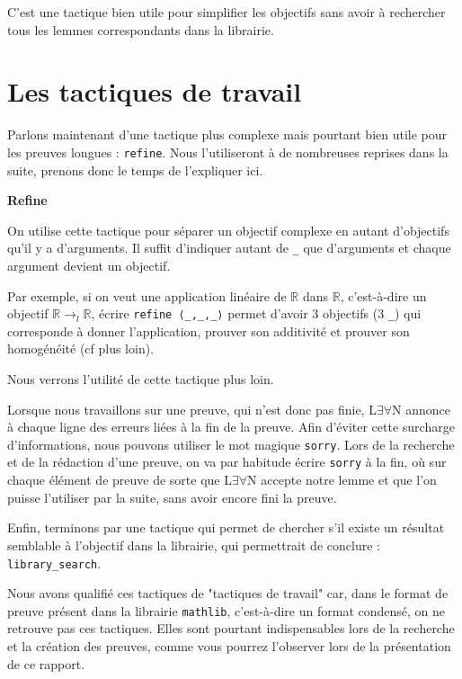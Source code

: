 \documentclass[a4paper, 11pt, twoside]{report}
\newcommand\R{\mathbb{R}}
\newcommand{\LEAN}{L$\exists\forall$N }
\begin{document}
C'est une tactique bien utile pour simplifier les objectifs sans avoir à rechercher tous les lemmes correspondants dans la librairie.

\section{Les tactiques de travail}

Parlons maintenant d'une tactique plus complexe mais pourtant bien utile pour les preuves longues : \verb|refine|. Nous l'utiliseront à de nombreuses reprises dans la suite, prenons donc le temps de l'expliquer ici.

\begin{tactic}
	\centerline{\bfseries Refine}
	
	On utilise cette tactique pour séparer un objectif complexe en autant d'objectifs qu'il y a d'arguments. Il suffit d'indiquer autant de \verb|_| que d'arguments et chaque argument devient un objectif.
	
	\tcblower
	
	Par exemple, si on veut une application linéaire de $\R$ dans $\R$, c'est-à-dire un objectif $\R \to_l \R$, écrire \verb|refine ⟨_,_,_⟩| permet d'avoir 3 objectifs (3 \verb|_|) qui corresponde à donner l'application, prouver son additivité et prouver son homogénéité (cf plus loin).
\end{tactic}

Nous verrons l'utilité de cette tactique plus loin.

\medskip

Lorsque nous travaillons sur une preuve, qui n'est donc pas finie, \LEAN annonce à chaque ligne des erreurs liées à la fin de la preuve. Afin d'éviter cette surcharge d'informations, nous pouvons utiliser le mot magique \verb|sorry|. Lors de la recherche et de la rédaction d'une preuve, on va par habitude écrire \verb|sorry| à la fin, où sur chaque élément de preuve de sorte que \LEAN accepte notre lemme et que l'on puisse l'utiliser par la suite, sans avoir encore fini la preuve.

\medskip

Enfin, terminons par une tactique qui permet de chercher s'il existe un résultat semblable à l'objectif dans la librairie, qui permettrait de conclure : \verb|library_search|.

\bigskip

Nous avons qualifié ces tactiques de "tactiques de travail" car, dans le format de preuve présent dans la librairie \verb|mathlib|, c'est-à-dire un format condensé, on ne retrouve pas ces tactiques. Elles sont pourtant indispensables lors de la recherche et la création des preuves, comme vous pourrez l'observer lors de la présentation de ce rapport.
\end{document}
